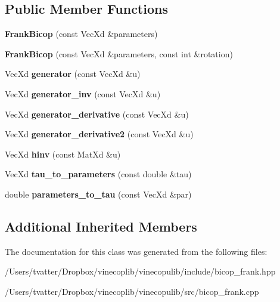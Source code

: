 \subsection*{Public Member Functions}
\begin{DoxyCompactItemize}
\item 
\mbox{\label{class_frank_bicop_ae019221e15eba598f29d9120ac6d1f5c}} 
{\bfseries Frank\+Bicop} (const Vec\+Xd \&parameters)
\item 
\mbox{\label{class_frank_bicop_af789907cefc0049b2ce6ea4596195d48}} 
{\bfseries Frank\+Bicop} (const Vec\+Xd \&parameters, const int \&rotation)
\item 
\mbox{\label{class_frank_bicop_aac20b71ec67ea5067c5342c085a0e306}} 
Vec\+Xd {\bfseries generator} (const Vec\+Xd \&u)
\item 
\mbox{\label{class_frank_bicop_a3e433ca2c858e95c11896d2d6a445648}} 
Vec\+Xd {\bfseries generator\+\_\+inv} (const Vec\+Xd \&u)
\item 
\mbox{\label{class_frank_bicop_a19d2a80d449caa48d75690be81c2db02}} 
Vec\+Xd {\bfseries generator\+\_\+derivative} (const Vec\+Xd \&u)
\item 
\mbox{\label{class_frank_bicop_a07d9488138a598fa9aa770da2153f269}} 
Vec\+Xd {\bfseries generator\+\_\+derivative2} (const Vec\+Xd \&u)
\item 
\mbox{\label{class_frank_bicop_ab755de64fbdf692303b4d6436bb41583}} 
Vec\+Xd {\bfseries hinv} (const Mat\+Xd \&u)
\item 
\mbox{\label{class_frank_bicop_ad4c350e726aa9ca7682d77c3e4e6ed3c}} 
Vec\+Xd {\bfseries tau\+\_\+to\+\_\+parameters} (const double \&tau)
\item 
\mbox{\label{class_frank_bicop_a59f4a4bbe5eb724d18091c2cd379e268}} 
double {\bfseries parameters\+\_\+to\+\_\+tau} (const Vec\+Xd \&par)
\end{DoxyCompactItemize}
\subsection*{Additional Inherited Members}


The documentation for this class was generated from the following files\+:\begin{DoxyCompactItemize}
\item 
/\+Users/tvatter/\+Dropbox/vinecoplib/vinecopulib/include/bicop\+\_\+frank.\+hpp\item 
/\+Users/tvatter/\+Dropbox/vinecoplib/vinecopulib/src/bicop\+\_\+frank.\+cpp\end{DoxyCompactItemize}
